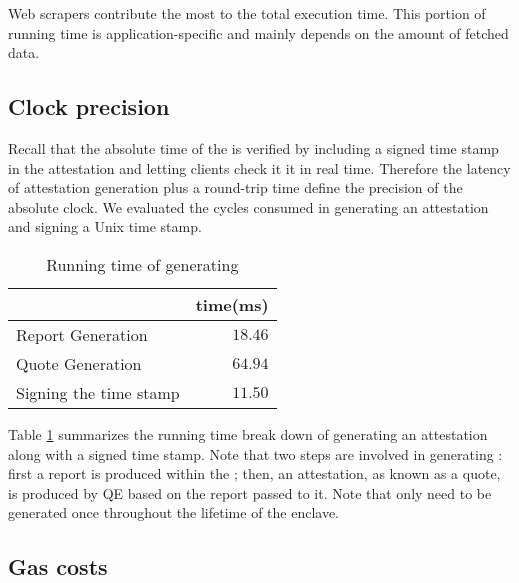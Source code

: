 Web scrapers contribute the most to the
total execution time. This portion of running time
is application-specific and mainly depends on the
amount of fetched data.


\subsection{Clock precision}

Recall that the absolute time of the \encname is verified
by including a signed time stamp in the attestation and letting 
clients check it it in real time. Therefore the latency
of attestation generation plus a round-trip time
define the precision of the absolute clock. 
We evaluated the cycles consumed in generating an attestation and
signing a Unix time stamp.


\begin{table}[ht]
\centering
\begin{tabular}{lr}
\toprule
  & time(ms) \\
\midrule
Report Generation & $18.46$ \\
Quote Generation & $64.94$ \\
Signing the time stamp & $11.50$ \\
\bottomrule
\end{tabular}
\caption{Running time of generating \att}
\label{tab:eval_att}
\end{table}

Table \ref{tab:eval_att} summarizes the running time break down of generating an
attestation along with a signed time stamp.  Note that two steps are involved in
generating \att: first a report is produced within the \encname; then, an
attestation, as known as a quote, is produced by QE based on the report passed
to it. Note that \att only need to be generated once throughout the lifetime of the
enclave.


\subsection{Gas costs}

